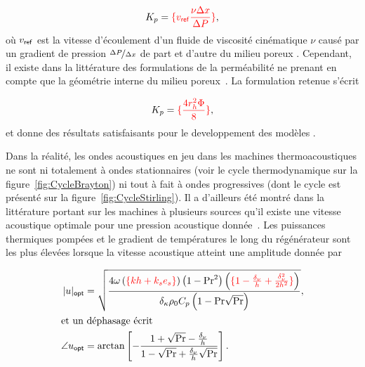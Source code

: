 \begin{equation}
	K_p = \textcolor{red}{\{v_{\sf ref}\frac{\nu \Delta x}{\Delta P}\}},
	\label{eq:DefPermeabilite_Wikipedia}
\end{equation}
où $v_{\sf ref}$ est la vitesse d'écoulement d'un fluide de viscosité cinématique $\nu$ causé par un gradient de pression $\nicefrac{\Delta P}{\Delta x}$ de part et d'autre du milieu poreux \cite{nield_convection_2013}. Cependant, il existe dans la littérature des formulations de la perméabilité ne prenant en compte que la géométrie interne du milieu poreux~\cite{dullien_porous_1992}. La formulation retenue s'écrit

\begin{equation}
	K_p = \textcolor{red}{\{\frac{4 r_h^2 \Phi}{8}\}},
	\label{eq:DefPermeabilite_LISN}
\end{equation}
et donne des résultats satisfaisants pour le developpement des modèles \cite{hireche_experimental_2020}.\bigskip

Dans la réalité, les ondes acoustiques en jeu dans les machines thermoacoustiques ne sont ni totalement \og à ondes stationnaires \fg{} (voir le cycle thermodynamique sur la figure~\ref{fig:CycleBrayton}) ni tout à fait \og à ondes progressives \fg{} (dont le cycle est présenté sur la figure~\ref{fig:CycleStirling}). Il a d'ailleurs été montré dans la littérature portant sur les machines à plusieurs sources qu'il existe une vitesse acoustique optimale pour une pression acoustique donnée~\cite{poignand_etude_2006}. Les puissances thermiques pompées et le gradient de températures le long du régénérateur sont les plus élevées lorsque la vitesse acoustique atteint une amplitude donnée par

\begin{subequations}
	\begin{align}
		|u|_{\sf opt} &= \sqrt{\frac{4\omega\left(\textcolor{red}{\{kh+k_se_s\}}\right)\left(1-\mathrm{Pr}^2\right)\left(\textcolor{red}{\{1-\frac{\delta_\nu}{h}+\frac{\delta_\nu^2}{2h^2}\}}\right)}{\delta_\kappa \rho_0 C_p \left(1-\mathrm{Pr}\sqrt{\mathrm{Pr}}\right)}},	\label{eq:u_mag_opt_Gaelle}\\
		\intertext{et un déphasage écrit}
		\angle u_{\sf opt} &= \arctan\left[-\frac{1+\sqrt{\mathrm{Pr}}-\frac{\delta_\nu}{h}}{1-\sqrt{\mathrm{Pr}}+\frac{\delta_\nu}{h}\sqrt{\mathrm{Pr}}}\right].	\label{eq:u_arg_opt_Gaelle}
	\end{align}
	\label{eq:u_opt_Gaelle}
\end{subequations}

